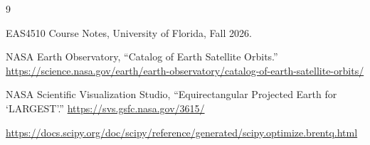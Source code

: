\begin{thebibliography}{9}

EAS4510 Course Notes, University of Florida, Fall 2026.

NASA Earth Observatory, ``Catalog of Earth Satellite Orbits.''
\url{https://science.nasa.gov/earth/earth-observatory/catalog-of-earth-satellite-orbits/}

NASA Scientific Visualization Studio, ``Equirectangular Projected Earth for `LARGEST'.''
\url{https://svs.gsfc.nasa.gov/3615/}

\url{https://docs.scipy.org/doc/scipy/reference/generated/scipy.optimize.brentq.html}

\end{thebibliography}
